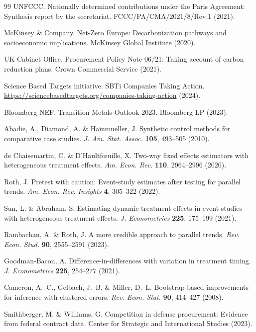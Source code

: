 \documentclass[11pt,a4paper]{article}
\begin{document}
\begin{thebibliography}{99}
UNFCCC. Nationally determined contributions under the Paris Agreement: Synthesis report by the secretariat. FCCC/PA/CMA/2021/8/Rev.1 (2021).

McKinsey \& Company. Net-Zero Europe: Decarbonization pathways and socioeconomic implications. McKinsey Global Institute (2020).

UK Cabinet Office. Procurement Policy Note 06/21: Taking account of carbon reduction plans. Crown Commercial Service (2021).

Science Based Targets initiative. SBTi Companies Taking Action. \url{https://sciencebasedtargets.org/companies-taking-action} (2024).

Bloomberg NEF. Transition Metals Outlook 2023. Bloomberg LP (2023).

Abadie, A., Diamond, A. \& Hainmueller, J. Synthetic control methods for comparative case studies. \textit{J. Am. Stat. Assoc.} \textbf{105}, 493--505 (2010).

de Chaisemartin, C. \& D'Haultf{\oe}uille, X. Two-way fixed effects estimators with heterogeneous treatment effects. \textit{Am. Econ. Rev.} \textbf{110}, 2964--2996 (2020).

Roth, J. Pretest with caution: Event-study estimates after testing for parallel trends. \textit{Am. Econ. Rev. Insights} \textbf{4}, 305--322 (2022).

Sun, L. \& Abraham, S. Estimating dynamic treatment effects in event studies with heterogeneous treatment effects. \textit{J. Econometrics} \textbf{225}, 175--199 (2021).

Rambachan, A. \& Roth, J. A more credible approach to parallel trends. \textit{Rev. Econ. Stud.} \textbf{90}, 2555--2591 (2023).

Goodman-Bacon, A. Difference-in-differences with variation in treatment timing. \textit{J. Econometrics} \textbf{225}, 254--277 (2021).

Cameron, A.~C., Gelbach, J.~B. \& Miller, D.~L. Bootstrap-based improvements for inference with clustered errors. \textit{Rev. Econ. Stat.} \textbf{90}, 414--427 (2008).

Smithberger, M. \& Williams, G. Competition in defense procurement: Evidence from federal contract data. Center for Strategic and International Studies (2023).


\end{thebibliography}
\end{document}
